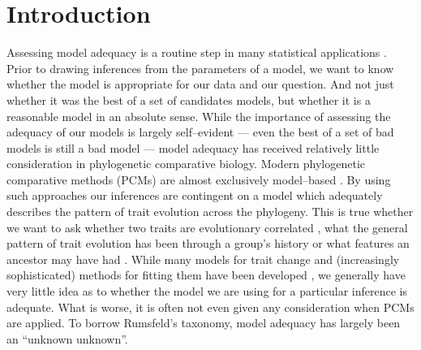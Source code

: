 \documentclass[a4paper,12pt]{article}
\begin{document}
\section{Introduction}

Assessing model adequacy is a routine step in many statistical applications \citep{Gelmanbook}. Prior to drawing inferences from the parameters of a model, we want to know whether the model is appropriate for our data and our question. And not just whether it was the best of a set of candidates models, but whether it is a reasonable model in an absolute sense. While the importance of assessing the adequacy of our models is largely self--evident --- even the best of a set of bad models is still a bad model --- model adequacy has received relatively little consideration in phylogenetic comparative biology. Modern phylogenetic comparative methods (PCMs) are almost exclusively model--based \citep[recently reviewed in][]{Omeara2012, PennellHarmon}. By using such approaches our inferences are contingent on a model which adequately describes the pattern of trait evolution across the phylogeny. This is true whether we want to ask whether two traits are evolutionary correlated \citep[e.g.][]{Felsenstein1985, Grafen1989, HarveyPagel1991}, what the general pattern of trait evolution has been through a group's history \citep[e.g.][]{Mooers1999, Harmon2010, Hunt2012} or what features an ancestor may have had \citep[e.g.][]{Schluter1997, Huelsenbeck2003}. While many models for trait change and (increasingly sophisticated) methods for fitting them have been developed \citep[e.g.][]{Felsenstein1985, Hansen1997, Pagel1999, ButlerKing2004, Omeara2006, Eastman2011, Beaulieu2012}, we generally have very little idea as to whether the model we are using for a particular inference is adequate. What is worse, it is often not even given any consideration when PCMs are applied. To borrow Rumsfeld's taxonomy, model adequacy has largely been an ``unknown unknown''.
\end{document}
